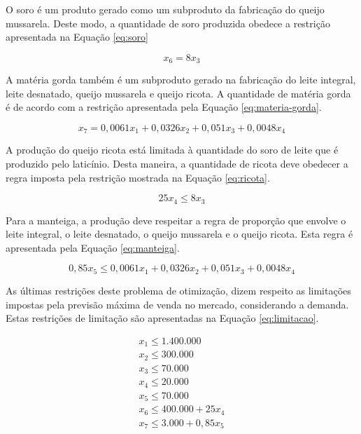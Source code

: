 \documentclass [11pt]{articleSBPO}
\begin{document}
O soro é um produto gerado como um subproduto da fabricação do queijo mussarela. Deste modo, a quantidade de soro produzida obedece a restrição apresentada na Equação \ref{eq:soro}

\begin{equation}
	x_6 = 8 x_3
	\label{eq:soro}
\end{equation}
				 
A matéria gorda também é um subproduto gerado na fabricação do leite integral, leite desnatado, queijo mussarela e queijo ricota. A quantidade de matéria gorda é de acordo com a restrição apresentada pela Equação \ref{eq:materia-gorda}.

\begin{equation}
	x_7 = 0,0061x_1 + 0,0326x_2 + 0,051x_3 + 0,0048x_4
	\label{eq:materia-gorda}
\end{equation}

A produção do queijo ricota está limitada à quantidade do soro de leite que é produzido pelo laticínio. Desta maneira, a quantidade de ricota deve obedecer a regra imposta pela restrição mostrada na Equação \ref{eq:ricota}.

\begin{equation}
	25x_4 \leq 8x_3
	\label{eq:ricota}
\end{equation}

Para a manteiga, a produção deve respeitar a regra de proporção que envolve o leite integral, o leite desnatado, o queijo mussarela e o queijo ricota. Esta regra é apresentada pela Equação \ref{eq:manteiga}.

\begin{equation}
	0,85 x_5 \leq 0,0061 x_1 + 0,0326 x_2 + 0,051 x_3 + 0,0048 x_4
	\label{eq:manteiga}
\end{equation}

As últimas restrições deste problema de otimização, dizem respeito as limitações impostas pela previsão máxima de venda no mercado, considerando a demanda. Estas restrições de limitação são apresentadas na Equação \ref{eq:limitacao}.

\begin{equation}
	\begin{array}{l}
		x_1 \leq 1.400.000\\
		x_2 \leq 300.000\\
		x_3 \leq 70.000\\
		x_4 \leq 20.000\\
		x_5 \leq 70.000\\
		x_6 \leq 400.000 + 25 x_4\\
		x_7 \leq 3.000 + 0,85 x_5\\
	\end{array}
	\label{eq:limitacao}
\end{equation}				
\end{document}
